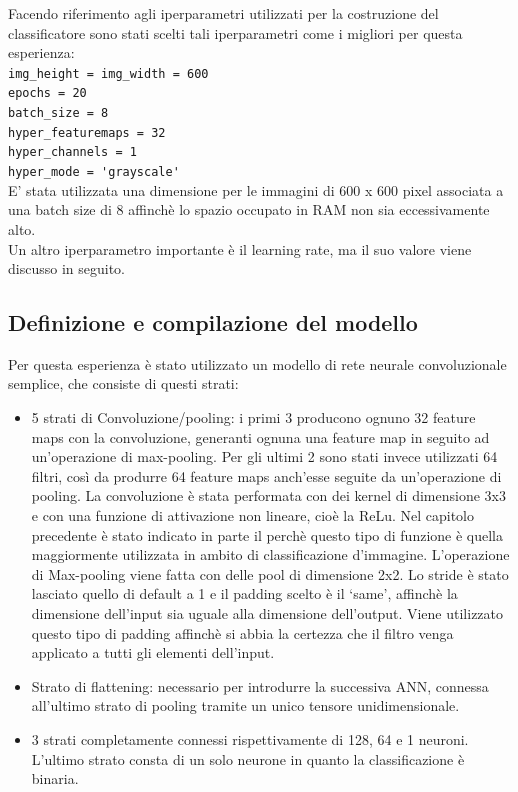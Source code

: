 Facendo riferimento agli iperparametri utilizzati per la costruzione del classificatore sono stati
 scelti tali iperparametri come i migliori per questa esperienza:\\
\lstinline{img_height = img_width = 600}\\
\lstinline{epochs = 20}\\
\lstinline{batch_size = 8}\\
\lstinline{hyper_featuremaps = 32}\\
\lstinline{hyper_channels = 1}\\
\lstinline{hyper_mode = 'grayscale'}\\

E’ stata utilizzata una dimensione per le immagini di 600 x 600 pixel associata a una batch size di 8
 affinchè lo spazio occupato in RAM non sia eccessivamente alto.  \\
 Un altro iperparametro importante è il learning rate, ma il suo valore viene discusso in seguito.

\subsection{Definizione e compilazione del modello}
Per questa esperienza è stato utilizzato un modello di rete neurale convoluzionale semplice, che consiste di questi strati:\\
\begin{itemize}
\item 5 strati di Convoluzione/pooling: i primi 3 producono ognuno 32 feature maps con la convoluzione, 
generanti ognuna una feature map in seguito ad un'operazione di max-pooling. Per gli ultimi 2 sono stati invece utilizzati 64 filtri, 
così da produrre 64 feature maps anch’esse seguite da un’operazione di pooling. La convoluzione è stata performata
 con dei kernel di dimensione 3x3 e con una funzione di attivazione non lineare, cioè la ReLu. Nel capitolo precedente
  è stato indicato in parte il perchè questo tipo di funzione è quella maggiormente utilizzata in ambito di
   classificazione d’immagine. 
           L'operazione di Max-pooling viene fatta con delle pool di dimensione
           2x2. Lo stride è stato lasciato quello di default a 1 e il padding scelto è il ‘same’, affinchè la
            dimensione dell’input sia uguale alla dimensione dell’output. Viene utilizzato questo tipo di padding affinchè si abbia la certezza che il filtro venga applicato a tutti gli elementi dell'input.
\item Strato di flattening: necessario per introdurre la successiva ANN, connessa all’ultimo strato
 di pooling tramite un unico tensore unidimensionale.
\item 3 strati completamente connessi rispettivamente di 128, 64 e 1 neuroni. 
L’ultimo strato consta di un solo neurone in quanto la classificazione è binaria. 
\end{itemize}

